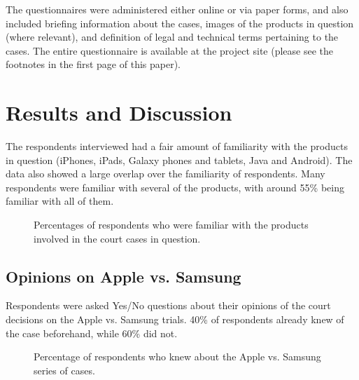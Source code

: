 \documentclass[prodmode,cs196]{acmlarge}
\begin{document}
The questionnaires were administered either online or via paper forms, and also included briefing information about the cases, images of the products in question (where relevant), and definition of legal and technical terms pertaining to the cases. The entire questionnaire is available at the project site (please see the footnotes in the first page of this paper).

\section{Results and Discussion}

The respondents interviewed had a fair amount of familiarity with the products in question (iPhones, iPads, Galaxy phones and tablets, Java and Android). The data also showed a large overlap over the familiarity of respondents. Many respondents were familiar with several of the products, with around 55\% being familiar with all of them.

\begin{figure}[H]
	\begin{bchart}[min=0, step=10 ,max=100]
            \smallskip
            \smallskip
			\smallskip
    \end{bchart}
	\caption{Percentages of respondents who were familiar with the products involved in the court cases in question.}
\end{figure}

\subsection{Opinions on Apple vs. Samsung}

Respondents were asked Yes/No questions about their opinions of the court decisions on the Apple vs. Samsung trials. 40\% of respondents already knew of the case beforehand, while 60\% did not.

\begin{figure}[H]
	\caption{Percentage of respondents who knew about the Apple vs. Samsung series of cases.}
\end{figure}
\end{document}
